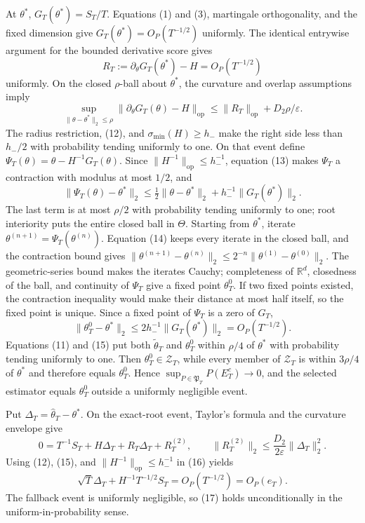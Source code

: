 At \(\theta^*\), \(G_T(\theta^*)=S_T/T\). Equations (1) and (3), martingale orthogonality, and the fixed dimension give \(G_T(\theta^*)=O_P(T^{-1/2})\) uniformly. The identical entrywise argument for the bounded derivative score gives
\[
 R_T:=\partial_\theta G_T(\theta^*)-H=O_P(T^{-1/2}) \tag{12}
\]
uniformly. On the closed \(\rho\)-ball about \(\theta^*\), the curvature and overlap assumptions imply
\[
 \sup_{\|\theta-\theta^*\|_2\le\rho}
 \|\partial_\theta G_T(\theta)-H\|_{\mathrm{op}}
 \le\|R_T\|_{\mathrm{op}}+D_2\rho/\varepsilon. \tag{13}
\]
The radius restriction, (12), and \(\sigma_{\min}(H)\ge h_-\) make the right side less than \(h_-/2\) with probability tending uniformly to one. On that event define \(\Psi_T(\theta)=\theta-H^{-1}G_T(\theta)\). Since \(\|H^{-1}\|_{\mathrm{op}}\le h_-^{-1}\), equation (13) makes \(\Psi_T\) a contraction with modulus at most \(1/2\), and
\[
 \|\Psi_T(\theta)-\theta^*\|_2
 \le\tfrac12\|\theta-\theta^*\|_2+h_-^{-1}\|G_T(\theta^*)\|_2. \tag{14}
\]
The last term is at most \(\rho/2\) with probability tending uniformly to one; root interiority puts the entire closed ball in \(\Theta\). Starting from \(\theta^*\), iterate \(\theta^{(n+1)}=\Psi_T(\theta^{(n)})\). Equation (14) keeps every iterate in the closed ball, and the contraction bound gives \(\|\theta^{(n+1)}-\theta^{(n)}\|_2\le2^{-n}\|\theta^{(1)}-\theta^{(0)}\|_2\). The geometric-series bound makes the iterates Cauchy; completeness of \(\mathbb R^d\), closedness of the ball, and continuity of \(\Psi_T\) give a fixed point \(\theta_T^0\). If two fixed points existed, the contraction inequality would make their distance at most half itself, so the fixed point is unique. Since a fixed point of \(\Psi_T\) is a zero of \(G_T\),
\[
 \|\theta_T^0-\theta^*\|_2
 \le2h_-^{-1}\|G_T(\theta^*)\|_2=O_P(T^{-1/2}). \tag{15}
\]
Equations (11) and (15) put both \(\widetilde\theta_T\) and \(\theta_T^0\) within \(\rho/4\) of \(\theta^*\) with probability tending uniformly to one. Then \(\theta_T^0\in\mathcal Z_T\), while every member of \(\mathcal Z_T\) is within \(3\rho/4\) of \(\theta^*\) and therefore equals \(\theta_T^0\). Hence \(\sup_{P\in\mathfrak P_T}P(E_T^c)\to0\), and the selected estimator equals \(\theta_T^0\) outside a uniformly negligible event.

Put \(\Delta_T=\widehat\theta_T-\theta^*\). On the exact-root event, Taylor's formula and the curvature envelope give
\[
 0=T^{-1}S_T+H\Delta_T+R_T\Delta_T+R_T^{(2)},
 \qquad \|R_T^{(2)}\|_2\le\frac{D_2}{2\varepsilon}\|\Delta_T\|_2^2. \tag{16}
\]
Using (12), (15), and \(\|H^{-1}\|_{\mathrm{op}}\le h_-^{-1}\) in (16) yields
\[
 \sqrt T\Delta_T+H^{-1}T^{-1/2}S_T
 =O_P(T^{-1/2})=O_P(e_T). \tag{17}
\]
The fallback event is uniformly negligible, so (17) holds unconditionally in the uniform-in-probability sense.

